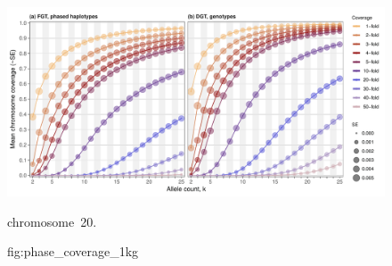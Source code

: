 

\begin{figure}[!htb]
\includegraphics[width=\textwidth]{./img/ch3/phase_coverage_1kg}
{

chromosome~20.
}
{fig:phase_coverage_1kg}
\end{figure}
